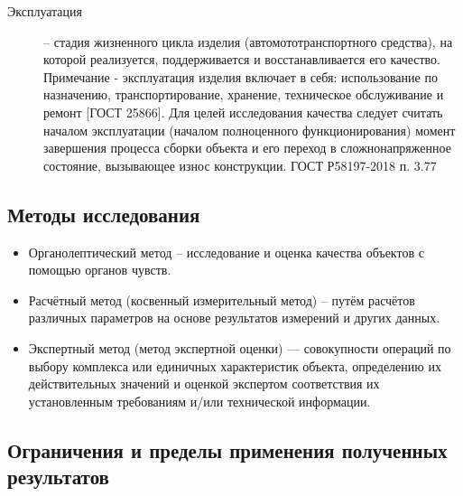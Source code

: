 \begin{description}
	\item[Эксплуатация] -- стадия жизненного цикла изделия (автомототранспортного средства), на которой реализуется, поддерживается и восстанавливается его качество. Примечание - эксплуатация изделия включает в себя: использование по назначению, транспортирование, хранение, техническое обслуживание и ремонт [ГОСТ 25866]. Для целей исследования качества следует считать началом эксплуатации (началом полноценного функционирования) момент завершения процесса сборки объекта и его переход в сложнонапряженное состояние, вызывающее износ конструкции. ГОСТ Р58197-2018 п. 3.77


\end{description}

\subsection{Методы исследования}
\begin{itemize}
\item
 Органолептический метод – исследование и оценка качества объектов с помощью органов чувств.
\item
 Расчётный метод (косвенный измерительный метод) – путём расчётов различных параметров на основе результатов измерений и других данных.
\item
 Экспертный метод (метод экспертной оценки) — совокупности операций по выбору комплекса или единичных характеристик объекта, определению их действительных значений и оценкой экспертом соответствия их установленным требованиям и/или технической информации.
\end{itemize}
%
%
\subsection{Ограничения и пределы применения полученных результатов}

